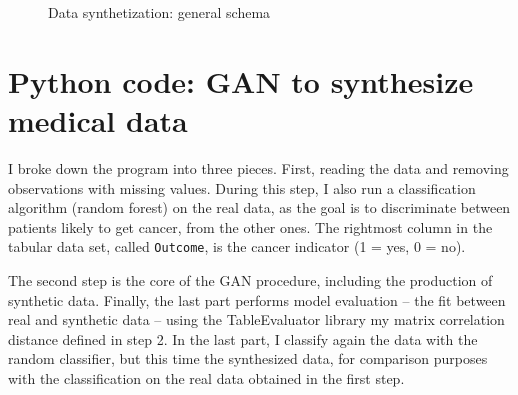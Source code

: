 \documentclass[oneside,10pt]{book}
\begin{document}
\begin{figure}[H]
{
} %
\caption{Data synthetization: general schema} \label{fig:digdig}
\end{figure}


\section{Python code: GAN to synthesize medical data}\label{pyganvg}

I broke down the program into three pieces. First, reading the data and removing observations with missing values. During this step, I also run a classification algorithm (random forest) on the real data, as the goal is to discriminate between patients likely to get cancer, from the other ones. 
 The rightmost column in the tabular data set, called \texttt{Outcome}, is the cancer indicator (1 = yes, 0 = no).

The second step is the core of the GAN procedure, including the production of synthetic data. Finally, the last part performs model evaluation   -- the fit between real and synthetic data -- using the TableEvaluator library my matrix correlation distance defined in step 2. In the last part, I classify again the data with the random classifier, but this time the synthesized data, for comparison purposes with the classification on the real data obtained in the first step.
\end{document}
